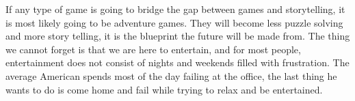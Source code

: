 \documentclass[12pt,letterpaper]{article}
\begin{document}
If any type of game is going to bridge the gap between games and storytelling,
it is most likely going to be adventure games. They will become less puzzle
solving and more story telling, it is the blueprint the future will be made
from. The thing we cannot forget is that we are here to entertain, and for most
people, entertainment does not consist of nights and weekends filled with
frustration. The average American spends most of the day failing at the office,
the last thing he wants to do is come home and fail while trying to relax and
be entertained.
\end{document}
